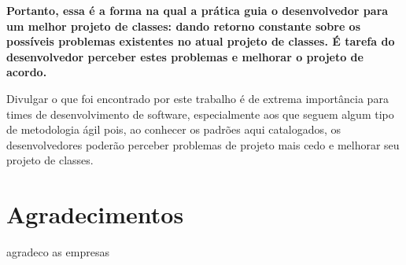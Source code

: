 \documentclass[conference]{IEEEtran}
\begin{document}
\textbf{Portanto, essa é a forma na qual a prática guia o desenvolvedor para
um melhor projeto de classes: dando retorno constante sobre os possíveis problemas
existentes no atual projeto de classes. É tarefa do desenvolvedor perceber
estes problemas e melhorar o projeto de acordo.}

Divulgar o que foi encontrado por este trabalho é de extrema importância
para times de desenvolvimento de software, especialmente aos que seguem
algum tipo de metodologia ágil pois, ao conhecer os padrões aqui catalogados,
os desenvolvedores poderão perceber problemas de projeto mais cedo e
melhorar seu projeto de classes.



\section*{Agradecimentos}


agradeco as empresas




\end{document}

